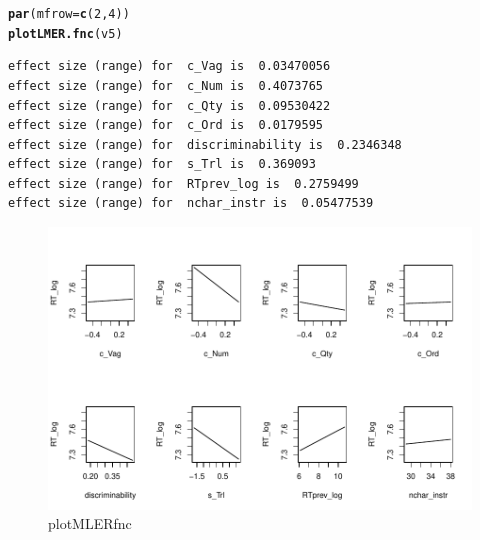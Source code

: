 \documentclass[a4paper,12pt]{article}\usepackage[]{graphicx}\usepackage[]{color}
\makeatletter
\def\maxwidth{ %
  \ifdim\Gin@nat@width>\linewidth
    \linewidth
  \else
    \Gin@nat@width
  \fi
}
\newcommand{\hlnum}[1]{\textcolor[rgb]{0.686,0.059,0.569}{#1}}%
\newcommand{\hlstd}[1]{\textcolor[rgb]{0.345,0.345,0.345}{#1}}%
\newcommand{\hlkwc}[1]{\textcolor[rgb]{0.333,0.667,0.333}{#1}}%
\newcommand{\hlkwd}[1]{\textcolor[rgb]{0.737,0.353,0.396}{\textbf{#1}}}%
\newenvironment{kframe}{%
 \def\at@end@of@kframe{}%
 \ifinner\ifhmode%
  \def\at@end@of@kframe{\end{minipage}}%
  \begin{minipage}{\columnwidth}%
 \fi\fi%
 \def\FrameCommand##1{\hskip\@totalleftmargin \hskip-\fboxsep
 \colorbox{shadecolor}{##1}\hskip-\fboxsep
     \hskip-\linewidth \hskip-\@totalleftmargin \hskip\columnwidth}%
 \MakeFramed {\advance\hsize-\width
   \@totalleftmargin\z@ \linewidth\hsize
   \@setminipage}}%
 {\par\unskip\endMakeFramed%
 \at@end@of@kframe}
\newenvironment{knitrout}{}{} %
\makeatother
\begin{document}
\begin{knitrout}\scriptsize
{}\color{fgcolor}\begin{kframe}
\begin{alltt}
\hlkwd{par}\hlstd{(}\hlkwc{mfrow} \hlstd{=} \hlkwd{c}\hlstd{(}\hlnum{2}\hlstd{,} \hlnum{4}\hlstd{))}
\hlkwd{plotLMER.fnc}\hlstd{(v5)}
\end{alltt}
\begin{verbatim}
effect size (range) for  c_Vag is  0.03470056 
effect size (range) for  c_Num is  0.4073765 
effect size (range) for  c_Qty is  0.09530422 
effect size (range) for  c_Ord is  0.0179595 
effect size (range) for  discriminability is  0.2346348 
effect size (range) for  s_Trl is  0.369093 
effect size (range) for  RTprev_log is  0.2759499 
effect size (range) for  nchar_instr is  0.05477539 
\end{verbatim}
\end{kframe}\begin{figure}[hbtp]

{\centering \includegraphics[width=\maxwidth]{figure/graphics-plotLMERfnc-1} 

}

\caption[plotMLERfnc]{plotMLERfnc}\label{fig:plotLMERfnc}
\end{figure}


\end{knitrout}

\clearpage
\end{document}
